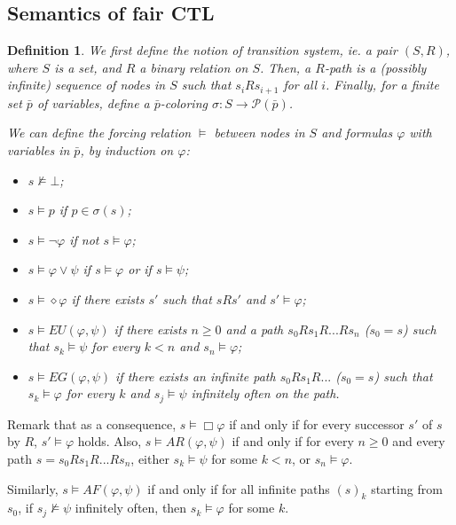 \documentclass[11pt]{article}
\newtheorem{definition}{Definition}[section]
\begin{document}
\subsection*{Semantics of fair CTL}\label{subsec:sem_CTLf}
\begin{definition}\label{forcing_rel_CTLf}
    We first define the notion of \emph{transition system}, ie. a pair $(S,R)$, where $S$ is a set, and $R$ a binary relation on $S$. Then, a \emph{$R$-path} is a (possibly infinite) sequence of nodes in $S$ such that $s_i R s_{i+1}$ for all $i$. Finally, for a finite set $\bar{p}$ of variables, define a \emph{$\bar{p}$-coloring} $\sigma : S \to \mathcal{P}(\bar{p})$.

    We can define the forcing relation $\models$ between nodes in $S$ and formulas $\varphi$ with variables in $\bar{p}$, by induction on $\varphi$:
    \begin{itemize}
        \setlength\itemsep{0em}
        \item[-] $s\not\models \bot$;
        \item[-] $s \models p$ if $p \in \sigma(s)$;
        \item[-] $s \models \neg\varphi$ if not $s \models \varphi$;
        \item[-] $s \models \varphi \vee \psi$ if $s\models \varphi$ or if $s\models \psi$;
        \item[-] $s\models \diamond\varphi$ if there exists $s'$ such that $sRs'$ and $s'\models \varphi$;
        \item[-] $s\models EU(\varphi,\psi)$ if there exists $n\geq 0$ and a path $s_0Rs_1R...Rs_n$ ($s_0=s$) such that $s_k\models\psi$ for every $k<n$ and $s_n\models\varphi$;
        \item[-] $s\models EG(\varphi,\psi)$ if there exists an infinite path $s_0Rs_1R...$ ($s_0=s$) such that $s_k\models\varphi$ for every $k$ and $s_j\models\psi$ infinitely often on the path.       
    \end{itemize}

\end{definition}

Remark that as a consequence, $s\models\Box\varphi$ if and only if for every successor $s'$ of $s$ by $R$, $s'\models\varphi$ holds.
Also, $s\models AR(\varphi,\psi)$ if and only if for every $n\geq 0$ and every path $s=s_0Rs_1R...Rs_n$, either $s_k\models\psi$ for some $k<n$, or $s_n\models\varphi$.

Similarly, $s\models AF(\varphi,\psi)$ if and only if for all infinite paths $(s)_k$ starting from $s_0$, if $s_j\not\models\psi$ infinitely often, then $s_k\models\varphi$ for some $k$.
\end{document}
